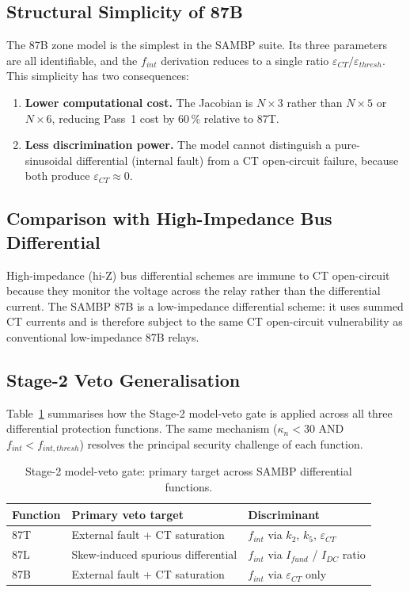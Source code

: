 \documentclass[12pt,a4paper]{article}
\newcommand{\kappan}{\kappa_n}
\begin{document}
\subsection{Structural Simplicity of 87B}

The 87B zone model is the simplest in the SAMBP suite.  Its three parameters
are all identifiable, and the $f_{int}$ derivation reduces to a single ratio
$\varepsilon_{CT}/\varepsilon_{thresh}$.  This simplicity has two consequences:

\begin{enumerate}
  \item \textbf{Lower computational cost.}  The Jacobian is $N \times 3$ rather
    than $N \times 5$ or $N \times 6$, reducing Pass~1 cost by 60\,\% relative
    to 87T.
  \item \textbf{Less discrimination power.}  The model cannot distinguish a
    pure-sinusoidal differential (internal fault) from a CT open-circuit failure,
    because both produce $\varepsilon_{CT} \approx 0$.
\end{enumerate}

\subsection{Comparison with High-Impedance Bus Differential}

High-impedance (hi-Z) bus differential schemes are immune to CT open-circuit
because they monitor the voltage across the relay rather than the differential
current.  The SAMBP 87B is a low-impedance differential scheme: it uses summed
CT currents and is therefore subject to the same CT open-circuit vulnerability
as conventional low-impedance 87B relays.

\subsection{Stage-2 Veto Generalisation}
\label{sec:veto_generalise}

Table~\ref{tab:veto_summary} summarises how the Stage-2 model-veto gate is
applied across all three differential protection functions.  The same mechanism
($\kappan < 30$ AND $f_{int} < f_{int,thresh}$) resolves the principal
security challenge of each function.

\begin{table}[h!]
\centering
\caption{Stage-2 model-veto gate: primary target across SAMBP differential functions.}
\label{tab:veto_summary}
\begin{tabular}{lll}
\toprule
Function & Primary veto target & Discriminant\\
\midrule
87T & External fault + CT saturation & $f_{int}$ via $k_2$, $k_5$, $\varepsilon_{CT}$ \\
87L & Skew-induced spurious differential & $f_{int}$ via $I_{fund}$ / $I_{DC}$ ratio \\
87B & External fault + CT saturation & $f_{int}$ via $\varepsilon_{CT}$ only \\
\bottomrule
\end{tabular}
\end{table}
\end{document}

